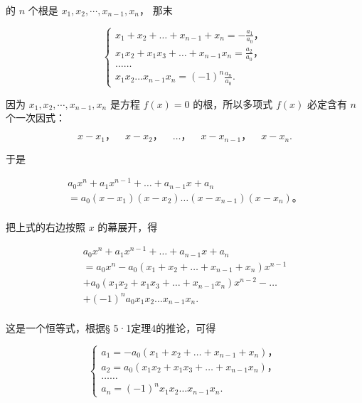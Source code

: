 的 \(n\) 个根是 \(x_{1}, x_{2}, \cdots, x_{n-1}, x_{n}\)， 那末

\[
\left\{ \begin{array}{l} x _ {1} + x _ {2} + \dots + x _ {n - 1} + x _ {n} = - \frac {a _ {1}}{a _ {0}}\text{，} \\ x _ {1} x _ {2} + x _ {1} x _ {3} + \dots + x _ {n - 1} x _ {n} = \frac {a _ {2}}{a _ {0}}\text{，} \\ \dots \dots \\ x _ {1} x _ {2} \dots x _ {n - 1} x _ {n} = (- 1) ^ {n} \frac {a _ {n}}{a _ {0}}. \end{array} \right.
\]

 因为 \(x_{1}, x_{2}, \cdots, x_{n-1}, x_{n}\) 是方程
\(f(x) = 0\) 的根，所以多项式 \(f(x)\) 必定含有 \(n\) 个一次因式：

\[
x - x _ {1}\text{，} \quad x - x _ {2}\text{，} \quad \dots \text{，} \quad x - x _ {n - 1}\text{，} \quad x - x _ {n}.
\]

于是

\[
\begin{array}{l} a _ {0} x ^ {n} + a _ {1} x ^ {n - 1} + \dots + a _ {n - 1} x + a _ {n} \\ = a _ {0} (x - x _ {1}) (x - x _ {2}) \dots (x - x _ {n - 1}) (x - x _ {n})\text{。} \\ \end{array}
\]

把上式的右边按照 \(x\) 的幕展开，得

\[
\begin{array}{l} a _ {0} x ^ {n} + a _ {1} x ^ {n - 1} + \dots + a _ {n - 1} x + a _ {n} \\ = a _ {0} x ^ {n} - a _ {0} \left(x _ {1} + x _ {2} + \dots + x _ {n - 1} + x _ {n}\right) x ^ {n - 1} \\ + a _ {0} \left(x _ {1} x _ {2} + x _ {1} x _ {3} + \dots + x _ {n - 1} x _ {n}\right) x ^ {n - 2} - \dots \\ + (- 1) ^ {n} a _ {0} x _ {1} x _ {2} \dots x _ {n - 1} x _ {n}. \\ \end{array}
\]

这是一个恒等式，根据§ 5·1定理4的推论，可得

\[
\left\{ \begin{array}{l} a _ {1} = - a _ {0} (x _ {1} + x _ {2} + \dots + x _ {n - 1} + x _ {n})\text{，} \\ a _ {2} = a _ {0} (x _ {1} x _ {2} + x _ {1} x _ {3} + \dots + x _ {n - 1} x _ {n})\text{，} \\ \dots \dots \\ a _ {n} = (- 1) ^ {n} x _ {1} x _ {2} \dots x _ {n - 1} x _ {n}. \end{array} \right.
\]

